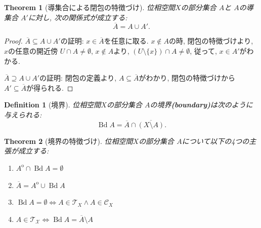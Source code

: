 \documentclass[dvipdfmx]{jbook}
\newcommand{\cl}[1]{\overline{ #1}  }
\newcommand{\Int}[1]{#1 ^{\mathrm{o}} }
\newcommand{\bd}[1]{\operatorname{Bd}{#1}}
\newtheorem{theorem}{Theorem}[section]
\newtheorem{definition}{Definition}[section]
\theoremstyle{remark}
\theoremstyle{plain}
\begin{document}
\begin{theorem}[導集合による閉包の特徴づけ]
	位相空間$X$の部分集合 $A$と $A$の導集合 $A'$に対し, 次の関係式が成立する:
	\[
	\cl{A} = A \cup A'
	.\] 
\end{theorem}

\begin{proof}
	$\cl{A} \subseteq A \cup A'$の証明:  $x \in \cl{A}$を任意に取る.  
	$x \not\in  A $の時, 閉包の特徴づけより, $x$の任意の開近傍 $U \cap A \neq \emptyset$, $x \not\in  A$より, $\left( U \setminus \{x\}  \right) \cap A \neq \emptyset $, 従って, $x \in A'$がわかる.

	 $\cl{A} \supseteq A \cup A'$の証明: 閉包の定義より,  $A \subseteq \cl{A}$がわかり, 閉包の特徴づけから $A' \subseteq \cl{A}$が得られる.

\end{proof}

\begin{definition}[境界]
	位相空間$X$の部分集合 $A$の境界\textbf{(boundary)}は次のように与えられる:
	\[
	\bd{A}= \cl{A} \cap \cl{(X\setminus A)}
	.\] 
\end{definition}

\begin{theorem}[境界の特徴づけ]
	位相空間$X$の部分集合 $A$について以下の4つの主張が成立する: 
	 \begin{enumerate}
		\item $\Int{A} \cap \bd{A} = \emptyset$
		\item $\cl{A} = \Int{A} \cup \bd{A}$
		\item  $\bd{A} = \emptyset \iff A \in \mathcal{T}_X \land A \in \mathcal{C}_X$
		\item $A \in \mathcal{T_X} \iff \bd{A} = \cl{A} \setminus A $
	\end{enumerate}
\end{theorem}
\end{document}
